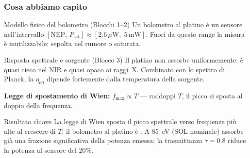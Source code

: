 \begin{frame}
\frametitle{Cosa abbiamo capito}
\small

\begin{block}{Modello fisico del bolometro (Blocchi 1--2)}
  Un bolometro al platino \`e un sensore  nell'intervallo
  $[\mathrm{NEP},\, P_\text{sat}] \approx [2.6\,\mu\mathrm{W},\;5\,\mathrm{mW}]$.
  Fuori da questo range la misura \`e inutilizzabile: sepolta nel rumore o saturata.
\end{block}

\vspace{0.2em}
\begin{block}{Risposta spettrale e sorgente (Blocco 3)}
  Il platino non assorbe uniformemente: \`e quasi cieco nel NIR e quasi opaco ai raggi~X.
  Combinato con lo spettro di Planck, la  $\eta_\text{eff}$ dipende fortemente dalla temperatura della sorgente.
\end{block}

\vspace{0.2em}
\textbf{Legge di spostamento di Wien:} $f_\text{max} \propto T$
--- raddoppi $T$, il picco si sposta al doppio della frequenza.

\vspace{0.2em}
\begin{alertblock}{Risultato chiave}
  La legge di Wien sposta il picco spettrale verso frequenze pi\`u alte al crescere
  di $T$: il bolometro al platino \`e .
  A \SI{85}{\eV} (SOL nominale) assorbe gi\`a una frazione significativa della
  potenza emessa; la trasmittanza $\tau = 0.8$ riduce la potenza al sensore del 20\%.
\end{alertblock}

\end{frame}
